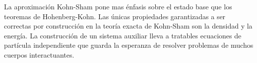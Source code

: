 La aproximación Kohn-Sham pone mas énfasis sobre el estado base que los teoremas de Hohenberg-Kohn. Las únicas propiedades  garantizadas a ser correctas por construcción en la teoría exacta de Kohn-Sham son la densidad y la energía. La construcción de un sistema auxiliar lleva a tratables ecuaciones de partícula independiente que guarda la esperanza de resolver problemas de muchos cuerpos interactuantes\cite{martin_2004}.








